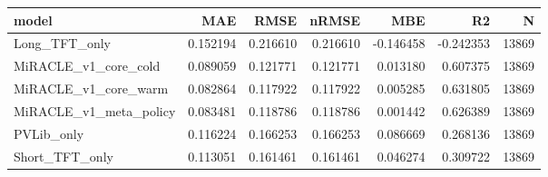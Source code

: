 \begin{tabular}{lrrrrrr}
\toprule
model & MAE & RMSE & nRMSE & MBE & R2 & N \\
\midrule
Long_TFT_only & 0.152194 & 0.216610 & 0.216610 & -0.146458 & -0.242353 & 13869 \\
MiRACLE_v1_core_cold & 0.089059 & 0.121771 & 0.121771 & 0.013180 & 0.607375 & 13869 \\
MiRACLE_v1_core_warm & 0.082864 & 0.117922 & 0.117922 & 0.005285 & 0.631805 & 13869 \\
MiRACLE_v1_meta_policy & 0.083481 & 0.118786 & 0.118786 & 0.001442 & 0.626389 & 13869 \\
PVLib_only & 0.116224 & 0.166253 & 0.166253 & 0.086669 & 0.268136 & 13869 \\
Short_TFT_only & 0.113051 & 0.161461 & 0.161461 & 0.046274 & 0.309722 & 13869 \\
\bottomrule
\end{tabular}

